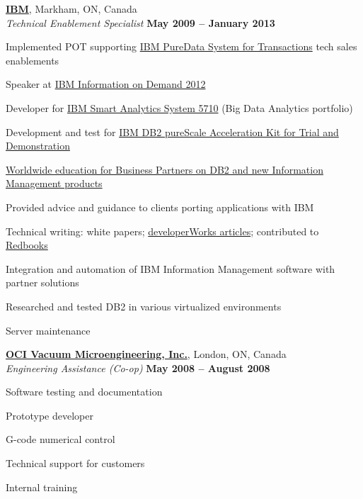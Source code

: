 \documentclass[margin,line]{resume}
\begin{document}
\begin{resume}
	\textbf{\href{http://www.ibm.com/}{IBM}}, Markham, ON, Canada					\vspace{2mm}\\\vspace{1mm}
	\textsl{Technical Enablement Specialist}		\hfill\textbf{May 2009 -- January 2013}		\\\vspace{-3mm}
	\begin{list2}
		\item Implemented POT supporting \href{https://www-01.ibm.com/software/data/puredata/transactions/}{IBM PureData System for Transactions} tech sales enablements
		\item Speaker at \href{https://www-01.ibm.com/software/data/2012-conference/}{IBM Information on Demand 2012}
		\item Developer for \href{http://www-01.ibm.com/software/data/infosphere/smart-analytics-system/5710/}{IBM Smart Analytics System 5710} (Big Data Analytics portfolio)
		\item Development and test for \href{https://www.ibm.com/developerworks/community/wikis/home?lang=en-us#!/wiki/Information+Management/page/IBM+DB2+pureScale+Acceleration+Kit+for+Trial+and+Demonstration}{IBM DB2 pureScale Acceleration Kit for Trial and Demonstration}
		\item \href{https://www.ibm.com/developerworks/community/wikis/home?lang=en#!/wiki/Information%20Management/page/Bootcamps%20and%20Education}{Worldwide education for Business Partners on DB2 and new Information Management products}
		\item Provided advice and guidance to clients porting applications with IBM
		\item Technical writing: white papers; \href{http://www.ibm.com/search/csass/search/?q=%22Piotr+Pruski%22&sn=dw&lang=en&cc=US&en=utf&hpp=20&dws=dw}{developerWorks articles}; contributed to \href{http://www.redbooks.ibm.com/abstracts/sg247805.html}{Redbooks}
		\item Integration and automation of IBM Information Management software with partner solutions
		\item Researched and tested DB2 in various virtualized environments
		\item Server maintenance
	\end{list2}

	\textbf{\href{http://www.ocivm.com/}{OCI Vacuum Microengineering, Inc.}}, London, ON, Canada	\vspace{2mm}\\\vspace{1mm}
	\textsl{Engineering Assistance (Co-op)}			\hfill\textbf{May 2008 -- August 2008}		\\\vspace{-3mm}
	\begin{list2}
		\item Software testing and documentation
		\item Prototype developer
		\item G-code numerical control
		\item Technical support for customers
		\item Internal training
	\end{list2}


\end{resume}
\end{document}
